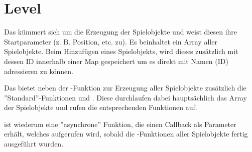 \chapter{Level}

Das  kümmert sich um die Erzeugung der Spielobjekte und weist diesen ihre Startparameter (z. B. Position, etc. zu). Es beinhaltet ein Array aller Spielobjekte. Beim Hinzufügen eines Spielobjekts, wird dieses zusätzlich mit dessen ID innerhalb einer Map gespeichert um es direkt mit Namen (ID) adressieren zu können.

Das  bietet neben der -Funktion zur Erzeugung aller Spielobjekte zusätzlich die ''Standard''-Funktionen  und . Diese durchlaufen dabei hauptsächlich das Array der Spielobjekte und rufen die entsprechenden Funktionen auf. 

 ist wiederum eine ''asynchrone'' Funktion, die einen Callback als Parameter erhält, welches aufgerufen wird, sobald die -Funktionen aller Spielobjekte fertig ausgeführt wurden. 